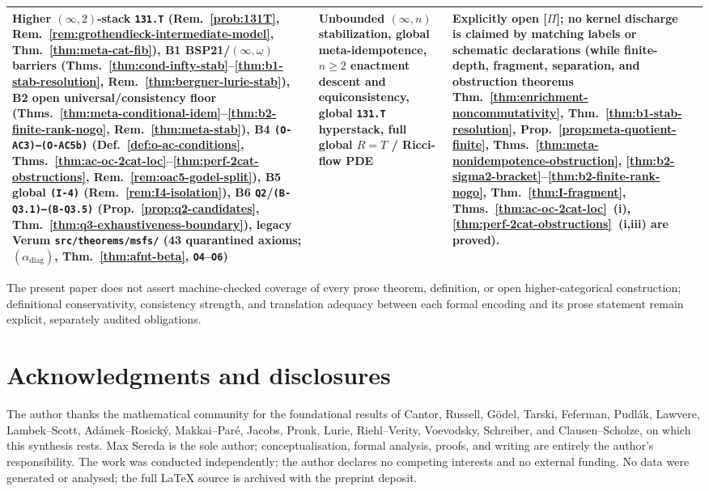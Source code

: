 \documentclass[11pt]{article}
\theoremstyle{plain}
\theoremstyle{definition}
\begin{document}
\begin{center}
\begin{tabular}{@{} >{\raggedright\arraybackslash}p{2.2cm} >{\raggedright\arraybackslash}p{4.0cm} >{\raggedright\arraybackslash}p{3.9cm} >{\raggedright\arraybackslash}p{3.9cm} @{}}
Higher $(\infty,2)$-stack \texttt{131.T} (Rem.~\ref{prob:131T}, Rem.~\ref{rem:grothendieck-intermediate-model}, Thm.~\ref{thm:meta-cat-fib}), B1 BSP21/$(\infty,\omega)$ barriers (Thms.~\ref{thm:cond-infty-stab}--\ref{thm:b1-stab-resolution}, Rem.~\ref{thm:bergner-lurie-stab}), B2 open universal/consistency floor (Thms.~\ref{thm:meta-conditional-idem}--\ref{thm:b2-finite-rank-nogo}, Rem.~\ref{thm:meta-stab}), B4 \texttt{(O-AC3)--(O-AC5b)} (Def.~\ref{def:o-ac-conditions}, Thms.~\ref{thm:ac-oc-2cat-loc}--\ref{thm:perf-2cat-obstructions}, Rem.~\ref{rem:oac5-godel-split}), B5 global \texttt{(I-4)} (Rem.~\ref{rem:I4-isolation}), B6 \texttt{Q2}/\texttt{(B-Q3.1)--(B-Q3.5)} (Prop.~\ref{prop:q2-candidates}, Thm.~\ref{thm:q3-exhaustiveness-boundary}), legacy Verum \texttt{src/\allowbreak theorems/\allowbreak msfs/} (43 quarantined axioms; $(\alpha_{\mathrm{diag}})$, Thm.~\ref{thm:afnt-beta}, \texttt{O4}--\texttt{O6}) &
Unbounded $(\infty,n)$ stabilization, global meta-idempotence, $n\ge 2$ enactment descent and equiconsistency, global \texttt{131.T} hyperstack, full global $R=T$ / Ricci-flow PDE &
Explicitly open \textup{[\textbf{$\Pi$}]}; no kernel discharge is claimed by matching labels or schematic declarations (while finite-depth, fragment, separation, and obstruction theorems Thm.~\ref{thm:enrichment-noncommutativity}, Thm.~\ref{thm:b1-stab-resolution}, Prop.~\ref{prop:meta-quotient-finite}, Thms.~\ref{thm:meta-nonidempotence-obstruction}, \ref{thm:b2-sigma2-bracket}--\ref{thm:b2-finite-rank-nogo}, Thm.~\ref{thm:I-fragment}, Thms.~\ref{thm:ac-oc-2cat-loc}~(i), \ref{thm:perf-2cat-obstructions}~(i,iii) are proved). \\
\bottomrule
\end{tabular}
\end{center}
The present paper does not assert machine-checked coverage of every prose theorem, definition, or open higher-categorical construction; definitional conservativity, consistency strength, and translation adequacy between each formal encoding and its prose statement remain explicit, separately audited obligations.

\section*{Acknowledgments and disclosures}

The author thanks the mathematical community for the foundational results of Cantor, Russell, G\"odel, Tarski, Feferman, Pudl\'ak, Lawvere, Lambek--Scott, Ad\'amek--Rosick\'y, Makkai--Par\'e, Jacobs, Pronk, Lurie, Riehl--Verity, Voevodsky, Schreiber, and Clausen--Scholze, on which this synthesis rests. Max Sereda is the sole author; conceptualisation, formal analysis, proofs, and writing are entirely the author's responsibility. The work was conducted independently; the author declares no competing interests and no external funding. No data were generated or analysed; the full LaTeX source is archived with the preprint deposit.
\end{document}
